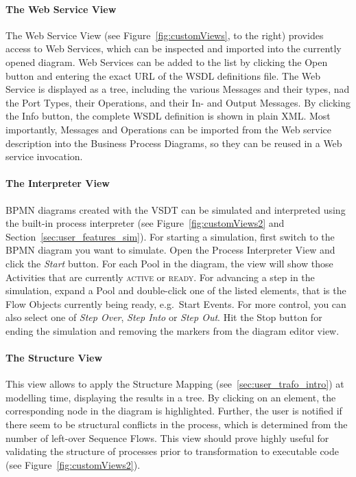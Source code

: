 \paragraph*{The Web Service View}
The Web Service View (see Figure~\ref{fig:customViews}, to the right) provides access to Web Services, which can be inspected and imported into the currently opened diagram.  Web Services can be added to the list by clicking the Open button and entering the exact URL of the WSDL definitions file.  The Web Service is displayed as a tree, including the various Messages and their types, nad the Port Types, their Operations, and their In- and Output Messages.  By clicking the Info button, the complete WSDL definition is shown in plain XML. Most importantly, Messages and Operations can be imported from the Web service description into the Business Process Diagrams, so they can be reused in a Web service invocation.


\paragraph*{The Interpreter View}
\label{sec:user_perspective_simView}
BPMN diagrams created with the VSDT can be simulated and interpreted using the built-in process interpreter (see Figure~\ref{fig:customViews2} and Section~\ref{sec:user_features_sim}).  For starting a simulation, first switch to the BPMN diagram you want to simulate. Open the Process Interpreter View and click the \emph{Start} button.  For each Pool in the diagram, the view will show those Activities that are currently \textsc{active} or \textsc{ready}.  For advancing a step in the simulation, expand a Pool and double-click one of the listed elements, that is the Flow Objects currently being ready, e.g.\ Start Events.  For more control, you can also select one of \emph{Step Over}, \emph{Step Into} or \emph{Step Out}.  Hit the Stop button for ending the simulation and removing the markers from the diagram editor view.

\paragraph*{The Structure View}
\label{sec:user_perspective_strucView}
This view allows to apply the Structure Mapping (see~\ref{sec:user_trafo_intro}) at modelling time, displaying the results in a tree.  By clicking on an element, the corresponding node in the diagram is highlighted.  Further, the user is notified if there seem to be structural conflicts in the process, which is determined from the number of left-over Sequence Flows.  This view should prove highly useful for validating the structure of processes prior to transformation to executable code (see Figure~\ref{fig:customViews2}).


